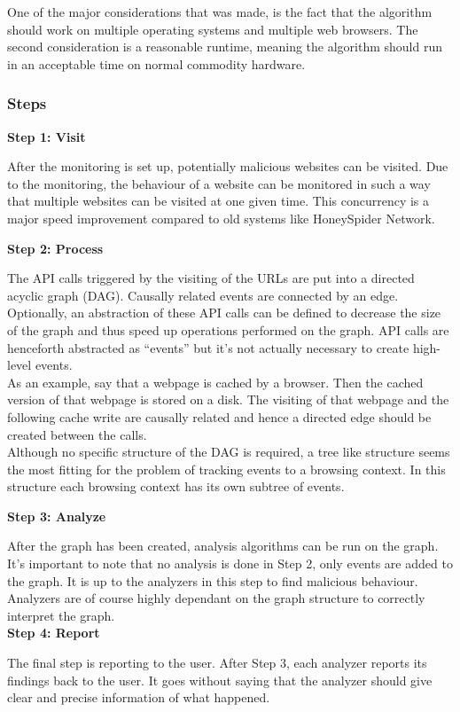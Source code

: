 One of the major considerations that was made, is the fact that the algorithm should work on multiple operating systems and multiple web browsers. The second consideration is a reasonable runtime, meaning the algorithm should run in an acceptable time on normal commodity hardware.

\subsubsection{Steps}

\textbf{Step 1: Visit}

After the monitoring is set up, potentially malicious websites can be visited. Due to the monitoring, the behaviour of a website can be monitored in such a way that multiple websites can be visited at one given time. This concurrency is a major speed improvement compared to old systems like HoneySpider Network.


\textbf{Step 2: Process}
\label{sec:algos2}

The API calls triggered by the visiting of the URLs are put into a directed acyclic graph (DAG). Causally related events are connected by an edge. Optionally, an abstraction of these API calls can be defined to decrease the size of the graph and thus speed up operations performed on the graph. API calls are henceforth abstracted as ``events'' but it's not actually necessary to create high-level events.\\


As an example, say that a webpage is cached by a browser. Then the cached version of that webpage is stored on a disk. The visiting of that webpage and the following cache write are causally related and hence a directed edge should be created between the calls.\\

Although no specific structure of the DAG is required, a tree like structure seems the most fitting for the problem of tracking events to a browsing context. In this structure each browsing context has its own subtree of events. 

\textbf{Step 3: Analyze}

After the graph has been created, analysis algorithms can be run on the graph. It's important to note that no analysis is done in Step 2, only events are added to the graph. It is up to the analyzers in this step to find malicious behaviour. Analyzers are of course highly dependant on the graph structure to correctly interpret the graph.\\

\textbf{Step 4: Report}

The final step is reporting to the user. After Step 3, each analyzer reports its findings back to the user. It goes without saying that the analyzer should give clear and precise information of what happened.
